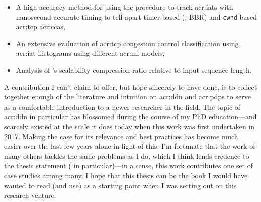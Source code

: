 \begin{itemize}
\begin{itemize}
		\item A high-accuracy method for using the \seidr{} procedure to track \glspl{acr:iat} with nanosecond-accurate timing to tell apart timer-based (\eg, BBR) and \texttt{cwnd}-based \gls{acr:tcp} \glspl{acr:cca},
		\item An extensive evaluation of \gls{acr:tcp} congestion control classification using \gls{acr:iat} histograms using different \gls{acr:ml} models,
		\item Analysis of \seidr's scalability compression ratio relative to input sequence length.
	\end{itemize}
\end{itemize}

A contribution I can't claim to offer, but hope sincerely to have done, is to collect together enough of the literature and intuition on \gls{acr:ddn} and \glspl{acr:pdp} to serve as a comfortable introduction to a newer researcher in the field.
The topic of \gls{acr:ddn} in particular has blossomed during the course of my PhD education---and scarcely existed at the scale it does today when this work was first undertaken in 2017.
Making the case for its relevance and best practices has become much easier over the last few years alone in light of this.
I'm fortunate that the work of many others tackles the same problems as I do, which I think lends credence to the thesis statement ( in particular)---in a sense, this work contributes one set of case studies among many.
I hope that this thesis can be the book I would have wanted to read (and use) as a starting point when I was setting out on this research venture.


%

